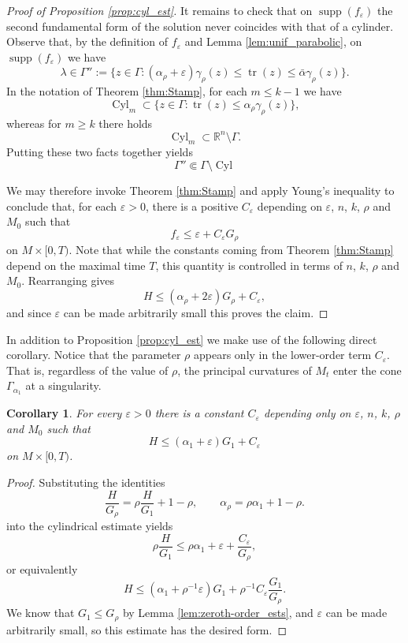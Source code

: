 \documentclass[12pt]{amsart}
\newtheorem{corollary}[theorem]{Corollary}
\DeclareMathOperator{\tr}{tr}
\DeclareMathOperator{\Cyl}{Cyl}
\DeclareMathOperator{\supp}{supp}
\begin{document}
\begin{proof}[Proof of Proposition \ref{prop:cyl_est}]
It remains to check that on $\supp(f_\varepsilon)$ the second fundamental form of the solution never coincides with that of a cylinder. Observe that, by the definition of $f_\varepsilon$ and Lemma \ref{lem:unif_parabolic}, on $\supp(f_\varepsilon)$ we have
\[\lambda \in \Gamma'' := \{z \in \Gamma : (\alpha_\rho + \varepsilon) \gamma_\rho(z) \leq \tr(z) \leq \bar \alpha \gamma_\rho(z)\}.\]
In the notation of Theorem \ref{thm:Stamp}, for each $m \leq k-1$ we have
\[\Cyl_m \subset \{z \in \Gamma :   \tr(z)\leq \alpha_\rho  \gamma_\rho(z)\},\]
whereas for $m \geq k$ there holds
\[\Cyl_m \subset \mathbb{R}^n \setminus \Gamma.\]
Putting these two facts together yields 
\[\Gamma'' \Subset \Gamma \setminus \Cyl\]

We may therefore invoke Theorem \ref{thm:Stamp} and apply Young's inequality to conclude that, for each $\varepsilon >0$, there is a positive $C_\varepsilon$ depending on $\varepsilon$, $n$, $k$, $\rho$ and $M_0$ such that
\[f_\varepsilon \leq \varepsilon + C_\varepsilon G_\rho\]
on $M\times [0,T)$. Note that while the constants coming from Theorem \ref{thm:Stamp} depend on the maximal time $T$, this quantity is controlled in terms of $n$, $k$, $\rho$ and $M_0$.
Rearranging gives 
\[H \leq (\alpha_\rho + 2\varepsilon) G_\rho + C_\varepsilon,\]
and since $\varepsilon $ can be made arbitrarily small this proves the claim.
\end{proof}

In addition to Proposition \ref{prop:cyl_est} we make use of the following direct corollary. Notice that the parameter $\rho$ appears only in the lower-order term $C_\varepsilon$. That is, regardless of the value of $\rho$, the principal curvatures of $M_t$ enter the cone $\Gamma_{\alpha_1}$ at a singularity. 

\begin{corollary}
\label{cor:cyl_est}
For every $\varepsilon >0$ there is a constant $C_\varepsilon$ depending only on $\varepsilon$, $n$, $k$, $\rho$ and $M_0$ such that 
\[H \leq (\alpha_1 + \varepsilon) G_1 + C_\varepsilon\]
on $M\times[0,T)$.
\end{corollary}

\begin{proof}
Substituting the identities
\[\frac{H}{G_\rho} = \rho \frac{H}{G_1} + 1-\rho, \qquad \alpha_{\rho} = \rho \alpha_1 + 1-\rho.\]
into the cylindrical estimate yields
\[\rho \frac{H}{G_1} \leq \rho \alpha_1 + \varepsilon + \frac{C_\varepsilon}{G_\rho},\]
or equivalently
\[H \leq (\alpha_1 + \rho^{-1} \varepsilon) G_1 + \rho^{-1} C_\varepsilon \frac{G_1}{G_\rho}.\]
We know that $G_1 \leq G_\rho$ by Lemma \ref{lem:zeroth-order_ests}, and $\varepsilon$ can be made arbitrarily small, so this estimate has the desired form. 
\end{proof}
\end{document}
